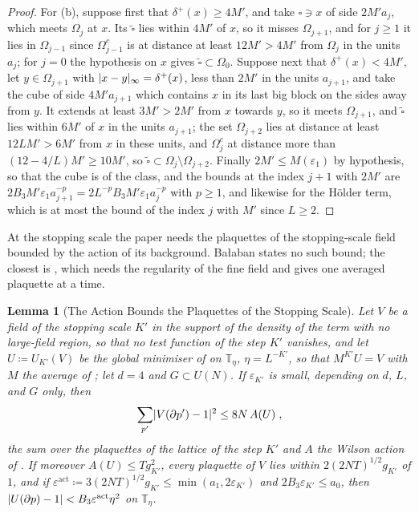 \documentclass[11pt]{preprint}
\DeclarePairedDelimiter{\abs}{\lvert}{\rvert}
\numberwithin{equation}{section}
\newtheorem{lemma}{Lemma}[section]
\theoremstyle{definition}
\theoremstyle{remark}
\theoremstyle{plain}
\begin{document}
\begin{proof}
For (b), suppose first that $\delta^+(x) \geq 4M'$, and take $\square \ni x$ of side $2M'a_j$, which meets $\Omega_j$ at $x$. Its $\tilde\square$ lies within $4M'$ of $x$, so it misses $\Omega_{j+1}$, and for $j \geq 1$ it lies in $\Omega_{j-1}$ since $\Omega_{j-1}^c$ is at distance at least $12M' > 4M'$ from $\Omega_j$ in the units $a_j$; for $j = 0$ the hypothesis on $x$ gives $\tilde\square \subset \Omega_0$. Suppose next that $\delta^+(x) < 4M'$, let $y \in \Omega_{j+1}$ with $\abs{x - y}_\infty = \delta^+(x)$, less than $2M'$ in the units $a_{j+1}$, and take the cube of side $4M'a_{j+1}$ which contains $x$ in its last big block on the sides away from $y$. It extends at least $3M' > 2M'$ from $x$ towards $y$, so it meets $\Omega_{j+1}$, and $\tilde\square$ lies within $6M'$ of $x$ in the units $a_{j+1}$; the set $\Omega_{j+2}$ lies at distance at least $12LM' > 6M'$ from $x$ in these units, and $\Omega_j^c$ at distance more than $(12 - 4/L)M' \geq 10M'$, so $\tilde\square \subset \Omega_j \setminus \Omega_{j+2}$. Finally $2M' \leq M(\varepsilon_1)$ by hypothesis, so that the cube is of the class, and the bounds \cite[(9)--(10)]{BalabanVAR} at the index $j + 1$ with $2M'$ are $2B_3M'\varepsilon_1a_{j+1}^{-p} = 2L^{-p}B_3M'\varepsilon_1a_j^{-p}$ with $p \geq 1$, and likewise for the H\"older term, which is at most the bound of the index $j$ with $M'$ since $L \geq 2$.
\end{proof}

At the stopping scale the paper needs the plaquettes of the stopping-scale field bounded by the action of its background. Ba{\l}aban states no such bound; the closest is \cite[(69)--(71), p.~273]{BalabanUV3}, which needs the regularity of the fine field and gives one averaged plaquette at a time.

\begin{lemma}[The Action Bounds the Plaquettes of the Stopping Scale]\label{lem:pf-action-lower-bound}
Let $V$ be a field of the stopping scale $K'$ in the support of the density of the term with no large-field region, so that no test function \cite[(2.17)]{BalabanCRE} of the step $K'$ vanishes, and let $U \coloneqq U_{K'}(V)$ be the global minimiser of \cite[(2.12)]{BalabanCRE} on $\mathbb T_\eta$, $\eta = L^{-K'}$, so that $M^{K'}U = V$ with $M$ the average of \cite[(0.4)]{BalabanRG1}; let $d = 4$ and $G \subset U(N)$. If $\varepsilon_{K'}$ is small, depending on $d$, $L$, and $G$ only, then
\begin{equation}\label{eq:action-lower-bound}
    \sum_{p'}\abs{V(\partial p') - 1}^2 \leq 8N\,A(U)\;,
\end{equation}
the sum over the plaquettes of the lattice of the step $K'$ and $A$ the Wilson action of \cite[(5), p.~278]{BalabanVAR}. If moreover $A(U) \leq Tg_{K'}^2$, every plaquette of $V$ lies within $2(2NT)^{1/2}g_{K'}$ of $1$, and if $\varepsilon^{\mathrm{act}} \coloneqq 3(2NT)^{1/2}g_{K'} \leq \min(a_1, 2\varepsilon_{K'})$ and $2B_3\varepsilon_{K'} \leq a_0$, then $\abs{U(\partial p) - 1} < B_3\varepsilon^{\mathrm{act}}\eta^2$ on $\mathbb T_\eta$.
\end{lemma}
\end{document}
